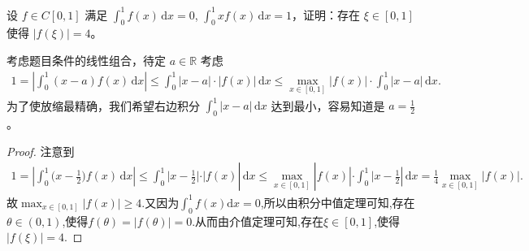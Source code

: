 \documentclass[../../main.tex]{subfiles}%
\begin{document}
\begin{example}
设 $f \in C[0,1]$ 满足 $\int_0^1 f(x) \, \mathrm{d}x = 0$, $\int_0^1 xf(x) \, \mathrm{d}x = 1$，证明：存在 $\xi \in [0,1]$ 使得 $|f(\xi)| = 4$。
\end{example}
\begin{note}
考虑题目条件的线性组合，待定 $a \in \mathbb{R}$ 考虑
\begin{align*}
1 = \left| \int_0^1 (x - a)f(x) \, \mathrm{d}x \right| \leqslant  \int_0^1 |x - a| \cdot |f(x)| \, \mathrm{d}x \leqslant  \max_{x \in [0,1]} |f(x)| \cdot \int_0^1 |x - a| \, \mathrm{d}x.
\end{align*}
为了使放缩最精确，我们希望右边积分 $\int_0^1 |x - a| \, \mathrm{d}x$ 达到最小，容易知道是 $a = \frac{1}{2}$。
\end{note}
\begin{proof}
注意到
\begin{align*}
1=\left| \int_0^1{(x}-\frac{1}{2})f(x)\,\mathrm{d}x \right|\leqslant \int_0^1{|x}-\frac{1}{2}|\cdot |f(x)|\,\mathrm{d}x\leqslant \max_{x\in [0,1]} |f(x)|\cdot \int_0^1{|x}-\frac{1}{2}|\,\mathrm{d}x=\frac{1}{4}\max_{x\in [0,1]} |f(x)|.
\end{align*}
故$\max_{x\in [0,1]} |f(x)|\geqslant 4$.又因为$\int_0^1{f(x) \mathrm{d}x}=0$,所以由积分中值定理可知,存在$\theta \in (0,1)$,使得$f(\theta) =\left| f(\theta) \right|=0$.从而由介值定理可知,存在$\xi \in [0,1]$,使得$\left| f(\xi) \right|=4$.
\end{proof}
\end{document}
